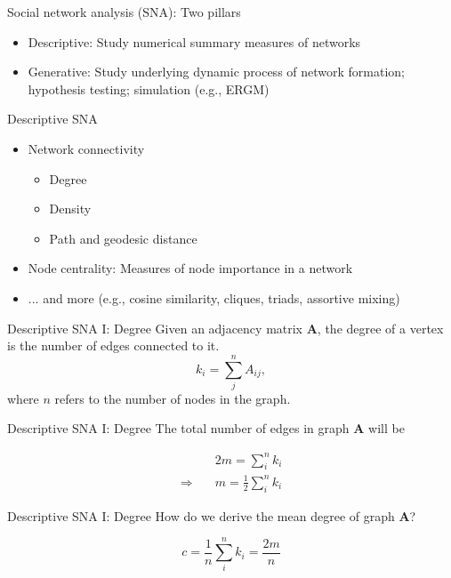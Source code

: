 \documentclass[10pt]{beamer}
\begin{document}
\begin{frame}{Social network analysis (SNA): Two pillars}
	\begin{itemize}
		\item Descriptive: Study numerical summary measures of networks
		\item Generative: Study underlying dynamic process of network formation; hypothesis testing; simulation (e.g., ERGM)
	\end{itemize}
\end{frame}

\begin{frame}{Descriptive SNA}
	\begin{itemize}
		\item Network connectivity
			\begin{itemize}
			\item Degree
			\item Density
			\item Path and geodesic distance
			\end{itemize}
		\item Node centrality: Measures of node importance in a network
		\item ... and more (e.g., cosine similarity, cliques, triads, assortive mixing)
	\end{itemize}
\end{frame}

\begin{frame}{Descriptive SNA I: Degree}
Given an adjacency matrix \textbf{A}, the degree of a vertex is the number of edges connected to it.
	\begin{equation}
	k_i  = \sum_j^n A_{ij},
	\end{equation}
where $n$ refers to the number of nodes in the graph.
\end{frame}

\begin{frame}{Descriptive SNA I: Degree}
The total number of edges in graph \textbf{A} will be
	
	\begin{equation}
	\begin{split}
	& 2m = \sum_i^n k_i\\
	\Rightarrow \quad & m = \frac{1}{2} \sum_i^n k_i
	\end{split}
	\end{equation}
\end{frame}

\begin{frame}{Descriptive SNA I: Degree}
How do we derive the mean degree of graph \textbf{A}?
	
	\begin{equation}
	c = \frac{1}{n} \sum_i^n k_i = \frac{2m}{n}
	\end{equation}
\end{frame}
\end{document}
